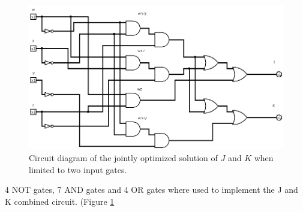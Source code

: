 \documentclass[12pt]{article}
\begin{document}
\begin{figure}[!htb]
\center
\includegraphics[scale=0.5]{JKjoint-01}
\caption{Circuit diagram of the jointly optimized solution of $J$ and $K$ when limited to two input gates.}
\label{fig:JKjointcircuit}
\end{figure}
4 NOT gates, 7 AND gates and 4 OR gates where used to implement the J and K combined circuit.
(Figure \ref{fig:JKjointcircuit}
\clearpage
\end{document}
